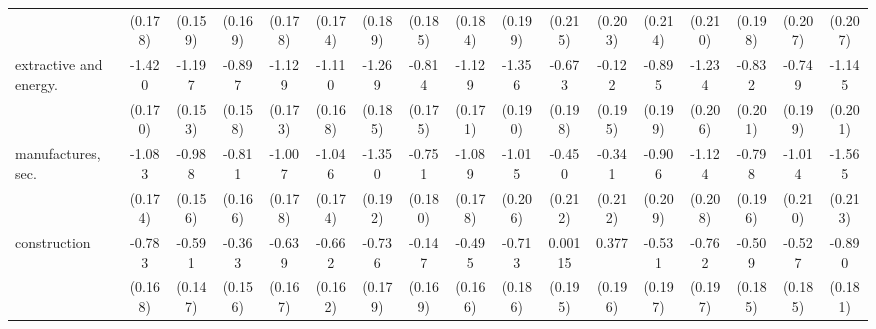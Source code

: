 {\begin{tabular}{l*{16}{c}}
                    &     (0.178)         &     (0.159)         &     (0.169)         &     (0.178)         &     (0.174)         &     (0.189)         &     (0.185)         &     (0.184)         &     (0.199)         &     (0.215)         &     (0.203)         &     (0.214)         &     (0.210)         &     (0.198)         &     (0.207)         &     (0.207)         \\
[1em]
extractive and energy.&      -1.420\sym{***}&      -1.197\sym{***}&      -0.897\sym{***}&      -1.129\sym{***}&      -1.110\sym{***}&      -1.269\sym{***}&      -0.814\sym{***}&      -1.129\sym{***}&      -1.356\sym{***}&      -0.673\sym{***}&      -0.122         &      -0.895\sym{***}&      -1.234\sym{***}&      -0.832\sym{***}&      -0.749\sym{***}&      -1.145\sym{***}\\
                    &     (0.170)         &     (0.153)         &     (0.158)         &     (0.173)         &     (0.168)         &     (0.185)         &     (0.175)         &     (0.171)         &     (0.190)         &     (0.198)         &     (0.195)         &     (0.199)         &     (0.206)         &     (0.201)         &     (0.199)         &     (0.201)         \\
[1em]
manufactures, sec.  &      -1.083\sym{***}&      -0.988\sym{***}&      -0.811\sym{***}&      -1.007\sym{***}&      -1.046\sym{***}&      -1.350\sym{***}&      -0.751\sym{***}&      -1.089\sym{***}&      -1.015\sym{***}&      -0.450\sym{*}  &      -0.341         &      -0.906\sym{***}&      -1.124\sym{***}&      -0.798\sym{***}&      -1.014\sym{***}&      -1.565\sym{***}\\
                    &     (0.174)         &     (0.156)         &     (0.166)         &     (0.178)         &     (0.174)         &     (0.192)         &     (0.180)         &     (0.178)         &     (0.206)         &     (0.212)         &     (0.212)         &     (0.209)         &     (0.208)         &     (0.196)         &     (0.210)         &     (0.213)         \\
[1em]
construction        &      -0.783\sym{***}&      -0.591\sym{***}&      -0.363\sym{*}  &      -0.639\sym{***}&      -0.662\sym{***}&      -0.736\sym{***}&      -0.147         &      -0.495\sym{**} &      -0.713\sym{***}&     0.00115         &       0.377         &      -0.531\sym{**} &      -0.762\sym{***}&      -0.509\sym{**} &      -0.527\sym{**} &      -0.890\sym{***}\\
                    &     (0.168)         &     (0.147)         &     (0.156)         &     (0.167)         &     (0.162)         &     (0.179)         &     (0.169)         &     (0.166)         &     (0.186)         &     (0.195)         &     (0.196)         &     (0.197)         &     (0.197)         &     (0.185)         &     (0.185)         &     (0.181)         \\

\end{tabular}}
